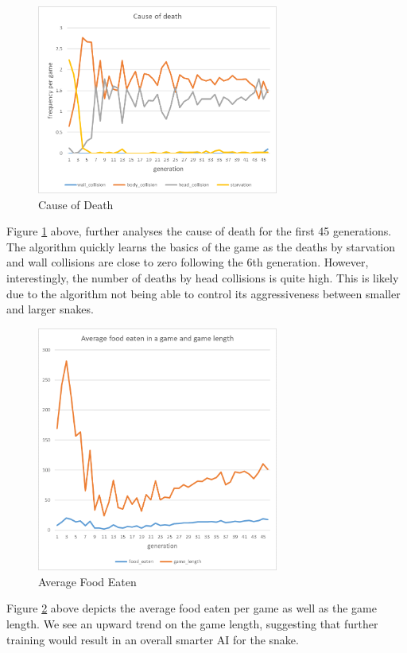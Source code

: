 \documentclass{article}
\begin{document}
\begin{figure}[!ht]
  \centering
  \includegraphics[width=300px]{cause_of_death}
  \caption{Cause of Death}
  \label{fig:cause_of_death}
\end{figure}

\FloatBarrier

Figure \ref{fig:cause_of_death} above, further analyses the cause of death for
the first 45 generations. The algorithm quickly learns the basics of the game as
the deaths by starvation and wall collisions are close to zero following the 6th
generation.  However, interestingly, the number of deaths by head collisions is
quite high.  This is likely due to the algorithm not being able to control its
aggressiveness between smaller and larger snakes.

\begin{figure}[!ht]
  \centering
  \includegraphics[width=300px]{average_food_eaten}
  \caption{Average Food Eaten}
  \label{fig:average_food_eaten}
\end{figure}

\FloatBarrier

Figure \ref{fig:average_food_eaten} above depicts the average food eaten per
game as well as the game length. We see an upward trend on the game length,
suggesting that further training would result in an overall smarter AI for
the snake.
\end{document}
